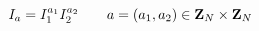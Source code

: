 \begin{equation}
I_a=I^{a_1}_1 I^{a_2}_2 \qquad
a=(a_1,a_2)\in {\bf Z}_N\times {\bf Z}_N
\label{basis}
\end{equation}

